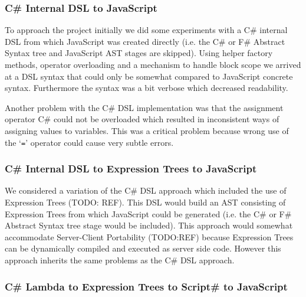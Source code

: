 		\subsubsection{C\# Internal DSL to JavaScript} %
		\label{ssub:c_internal_dsl_to_javascript}
			To approach the project initially we did some experiments with a C\# internal DSL from which JavaScript was created directly (i.e. the C\# or F\# Abstract Syntax tree and JavaScript AST stages are skipped). Using helper factory methods, operator overloading and a mechanism to handle block scope we arrived at a DSL syntax that could only be somewhat compared to JavaScript concrete syntax. Furthermore the syntax was a bit verbose which decreased readability. 

			Another problem with the C\# DSL implementation was that the assignment operator C\# could not be overloaded which resulted in inconsistent ways of assigning values to variables. This was a critical problem because wrong use of the ‘\texttt{=}’ operator could cause very subtle errors.


		\subsubsection{C\# Internal DSL to Expression Trees to JavaScript} %
		\label{ssub:c_internal_dsl_to_expression_trees_to_javascript}
			
			We considered a variation of the C\# DSL approach which included the use of Expression Trees (TODO: REF). This DSL would build an AST consisting of Expression Trees from which JavaScript could be generated (i.e. the C\# or F\# Abstract Syntax tree stage would be included). This approach would somewhat accommodate Server-Client Portability (TODO:REF) because Expression Trees can be dynamically compiled and executed as server side code. However this approach inherits the same problems as the C\# DSL approach.

		\subsubsection{C\# Lambda to Expression Trees to Script\# to JavaScript} %
		\label{ssub:c_lambda_to_expression_trees_to_script_to_javascript}
		
